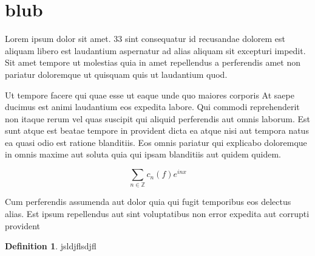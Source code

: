 \documentclass{article}
\theoremstyle{definition}
\newtheorem{definition}{Definition}[section]
\begin{document}
\section{blub}

Lorem ipsum dolor sit amet. 33 sint consequatur id recusandae dolorem est aliquam libero est laudantium aspernatur ad alias aliquam sit excepturi impedit. Sit amet tempore ut molestias quia in amet repellendus a perferendis amet non pariatur doloremque ut quisquam quis ut laudantium quod.

Ut tempore facere qui quae esse ut eaque unde quo maiores corporis At saepe ducimus est animi laudantium eos expedita labore. Qui commodi reprehenderit non itaque rerum vel quas suscipit qui aliquid perferendis aut omnis laborum. Est sunt atque est beatae tempore in provident dicta ea atque nisi aut tempora natus ea quasi odio est ratione blanditiis. Eos omnis pariatur qui explicabo doloremque in omnis maxime aut soluta quia qui ipsam blanditiis aut quidem quidem.

\begin{equation*}    
    \sum_{n \in \mathbb{Z}} c_n(f) e^{inx}
\end{equation*}

Cum perferendis assumenda aut dolor quia qui fugit temporibus eos delectus alias. Est ipsum repellendus aut sint voluptatibus non error expedita aut corrupti provident

\begin{definition}
    jsldjflsdjfl
\end{definition}
\end{document}
